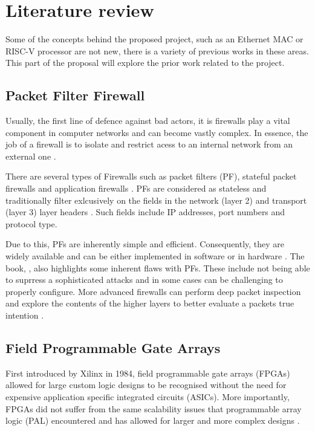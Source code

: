 \chapter[Literature review]{Literature review }
\label{Chap:label}	%
\pagestyle{headings}



Some of the concepts behind the proposed project, such as an Ethernet MAC or RISC-V processor are not new, there is a variety of previous works in these areas. This part of the proposal will explore the prior work related to the project. 




\section{Packet Filter Firewall}

Usually, the first line of defence against bad actors, it is firewalls play a vital component in computer networks and can become vastly complex. 
In essence, the job of a firewall is to isolate and restrict acess to an internal network from an external one \cite{BuildingInternetFirewalls}.

There are several types of Firewalls such as packet filters (PF), stateful packet firewalls and application firewalls \cite{FirewallsBook}. 
PFs are considered as stateless and traditionally filter exlcusively on the fields in the network (layer 2) and transport 
(layer 3) layer headers \cite{FirewallsBook}. Such fields include IP addresses, port numbers and protocol type.

Due to this, PFs are inherently simple and efficient. Consequently, they are widely available and can be either implemented in software or in 
hardware \cite{BuildingInternetFirewalls}. The book, \cite{BuildingInternetFirewalls}, also highlights some inherent flaws with PFs. These include not being able 
to suprress a sophisticated attacks and in some cases can be challenging to properly configure. More advanced firewalls can perform deep packet inspection and 
explore the contents of the higher layers to better evaluate a packets true intention \cite{FirewallsBook}. 




\section{Field Programmable Gate Arrays}
First introduced by Xilinx in 1984, field programmable gate arrays (FPGAs) allowed for large custom logic designs to be recognised without the need for 
expensive application specific integrated circuits (ASICs). More importantly, FPGAs did not suffer from the same scalability issues that
programmable array logic (PAL) encountered and has allowed for larger and more complex designs \cite{30YearsOfFPGA}. 

